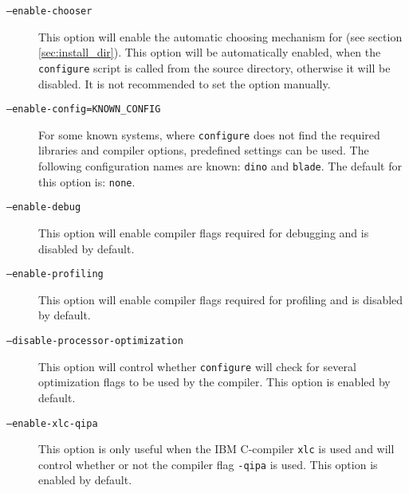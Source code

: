\begin{description}
\item [\texttt{--enable-chooser}] This option will enable the
  automatic choosing mechanism for \es{} (see section
  \vref{sec:install_dir}).  This option will be automatically enabled,
  when the \texttt{configure} script is called from the source
  directory, otherwise it will be disabled. It is not recommended to
  set the option manually.
\item[\texttt{--enable-config=KNOWN\_CONFIG}] For some known systems,
  where \texttt{configure} does not find the required libraries and
  compiler options, predefined settings can be used. The following
  configuration names are known: \texttt{dino} and \texttt{blade}. The
  default for this option is: \texttt{none}.
\item[\texttt{--enable-debug}] This option will enable compiler flags
  required for debugging \es{} and is disabled by default.
\item[\texttt{--enable-profiling}] This option will enable compiler
  flags required for profiling \es{} and is disabled by default.
\item[\texttt{--disable-processor-optimization}] This option will
  control whether \texttt{configure} will check for several
  optimization flags to be used by the compiler. This option is
  enabled by default.
\item[\texttt{--enable-xlc-qipa}] This option is only useful when the
  IBM C-compiler \texttt{xlc} is used and will control whether or not
  the compiler flag \texttt{-qipa} is used. This option is enabled by
  default.


\end{description}
